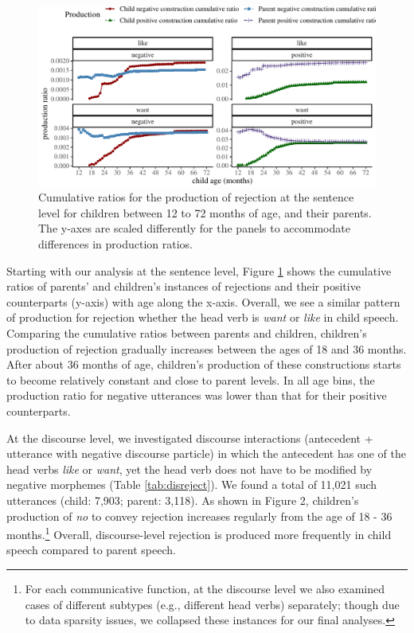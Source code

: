 \documentclass[
  english,
  man,floatsintext]{apa6}
\begin{document}
\begin{figure}[H]

{\centering \includegraphics{neg_construction_article_files/figure-latex/emotion-1} 

}

\caption{Cumulative ratios for the production of rejection at the sentence level for children between 12 to 72 months of age, and their parents. The y-axes are scaled differently for the panels to accommodate differences in production ratios.}\label{fig:emotion}
\end{figure}

Starting with our analysis at the sentence level, Figure \ref{fig:emotion} shows the cumulative ratios of parents' and children's instances of rejections and their positive counterparts (y-axis) with age along the x-axis. Overall, we see a similar pattern of production for rejection whether the head verb is \emph{want} or \emph{like} in child speech. Comparing the cumulative ratios between parents and children, children's production of rejection gradually increases between the ages of 18 and 36 months. After about 36 months of age, children's production of these constructions starts to become relatively constant and close to parent levels. In all age bins, the production ratio for negative utterances was lower than that for their positive counterparts.

At the discourse level, we investigated discourse interactions (antecedent + utterance with negative discourse particle) in which the antecedent has one of the head verbs \emph{like} or \emph{want}, yet the head verb does not have to be modified by negative morphemes (Table \ref{tab:disreject}). We found a total of 11,021 such utterances (child: 7,903; parent: 3,118). As shown in Figure 2, children's production of \emph{no} to convey rejection increases regularly from the age of 18 - 36 months.\footnote{For each communicative function, at the discourse level we also examined cases of different subtypes (e.g., different head verbs) separately; though due to data sparsity issues, we collapsed these instances for our final analyses.} Overall, discourse-level rejection is produced more frequently in child speech compared to parent speech.
\end{document}
